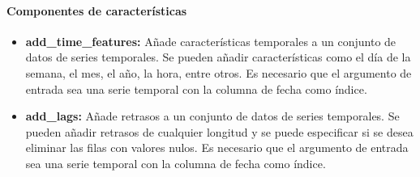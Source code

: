 \paragraph{Componentes de características}
\begin{itemize}
    \item \textbf{add\_time\_features:} Añade características temporales a un conjunto de datos
    de series temporales. Se pueden añadir características como el día de la semana, el mes, el año,
    la hora, entre otros. Es necesario que el argumento de entrada sea una serie temporal con la
    columna de fecha como índice.
    \item \textbf{add\_lags:} Añade retrasos a un conjunto de datos de series temporales. Se pueden
    añadir retrasos de cualquier longitud y se puede especificar si se desea eliminar las filas con
    valores nulos. Es necesario que el argumento de entrada sea una serie temporal con la columna de
    fecha como índice.
\end{itemize}


